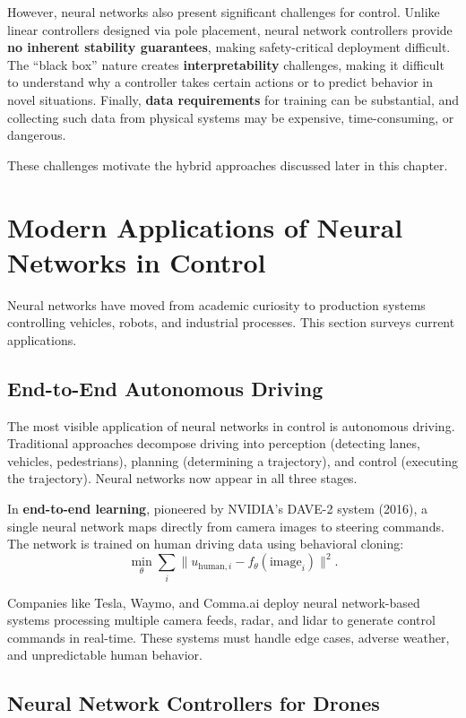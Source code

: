 However, neural networks also present significant challenges for control. Unlike linear controllers designed via pole placement, neural network controllers provide \textbf{no inherent stability guarantees}, making safety-critical deployment difficult. The ``black box'' nature creates \textbf{interpretability} challenges, making it difficult to understand why a controller takes certain actions or to predict behavior in novel situations. Finally, \textbf{data requirements} for training can be substantial, and collecting such data from physical systems may be expensive, time-consuming, or dangerous.

These challenges motivate the hybrid approaches discussed later in this chapter.


\section{Modern Applications of Neural Networks in Control}

Neural networks have moved from academic curiosity to production systems controlling vehicles, robots, and industrial processes. This section surveys current applications.

\subsection{End-to-End Autonomous Driving}

The most visible application of neural networks in control is autonomous driving. Traditional approaches decompose driving into perception (detecting lanes, vehicles, pedestrians), planning (determining a trajectory), and control (executing the trajectory). Neural networks now appear in all three stages.

In \textbf{end-to-end learning}, pioneered by NVIDIA's DAVE-2 system (2016), a single neural network maps directly from camera images to steering commands. The network is trained on human driving data using behavioral cloning:
\begin{equation}
\min_{\theta} \sum_{i} \|u_{\text{human},i} - f_{\theta}(\text{image}_i)\|^2.
\end{equation}

Companies like Tesla, Waymo, and Comma.ai deploy neural network-based systems processing multiple camera feeds, radar, and lidar to generate control commands in real-time. These systems must handle edge cases, adverse weather, and unpredictable human behavior.

\subsection{Neural Network Controllers for Drones}

